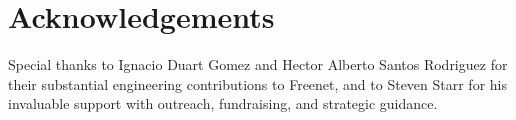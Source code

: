 \section*{Acknowledgements}

Special thanks to Ignacio Duart Gomez and Hector Alberto Santos
Rodriguez for their substantial engineering contributions to Freenet,
and to Steven Starr for his invaluable support with outreach,
fundraising, and strategic guidance.
